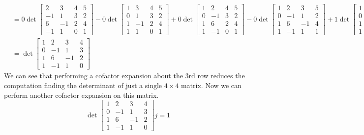 \documentclass{report}
\begin{document}
$$
\begin{aligned}
& =
0\operatorname{det}
\begin{bmatrix}
2&3&4&5\\
-1&1&3&2\\
6&-1&2&4\\
-1&1&0&1 
\end{bmatrix} - 0\operatorname{det}
\begin{bmatrix}
1&3&4&5\\
0&1&3&2\\
1&-1&2&4\\
1&1&0&1 
\end{bmatrix} +0\operatorname{det}
\begin{bmatrix}
1&2&4&5\\
0&-1&3&2\\
1&6&2&4\\
1&-1&0&1 
\end{bmatrix} -0\operatorname{det}
\begin{bmatrix}
1&2&3&5\\
0&-1&1&2\\
1&6&-1&4\\
1&-1&1&1 
\end{bmatrix} + 1\operatorname{det}
\begin{bmatrix}
1&2&3&4\\
0&-1&1&3\\
1&6&-1&2\\
1&-1&1&0 
\end{bmatrix} \\
& = \operatorname{det}
\begin{bmatrix}
1&2&3&4\\
0&-1&1&3\\
1&6&-1&2\\
1&-1&1&0 
\end{bmatrix}
\end{aligned}
$$
We can see that performing a cofactor expansion about the 3rd row reduces the computation finding the determinant of just a single $4\times4$ matrix.  Now we can perform another cofactor expansion on this matrix.
$$
\operatorname{det}
\begin{bmatrix}
1&2&3&4\\
0&-1&1&3\\
1&6&-1&2\\
1&-1&1&0 
\end{bmatrix}
j = 1
$$
\end{document}
